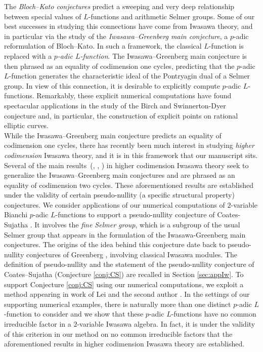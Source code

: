 \documentclass[a4paper,11pt]{article}
\numberwithin{equation}{section}
\begin{document}
The \emph{Bloch--Kato conjectures} predict a sweeping and very deep relationship between special values of $L$-functions and arithmetic Selmer groups. Some of our best successes in studying this connections have come from Iwasawa theory, and in particular via the study of the \textit{Iwasawa--Greenberg main conjecture}, a $p$-adic reformulation of Bloch--Kato. In such a framework, the classical $L$-function is replaced with a \emph{$p$-adic $L$-function}. The Iwasawa--Greenberg main conjecture is then phrased as an equality of codimension one cycles, predicting that the $p$-adic $L$-function generates the characteristic ideal of the Pontryagin dual of a Selmer group. In view of this connection, it is desirable to explicitly compute $p$-adic $L$-functions.  Remarkably, these explicit numerical computations have found spectacular applications in the study of the Birch and Swinnerton-Dyer conjecture and, in particular, the construction of explicit points on rational elliptic curves.\\

While the Iwasawa--Greenberg main conjecture predicts an equality of codimension one cycles, there has recently been much interest in studying \textit{higher codimension} Iwasawa theory, and it is in this framework that our manuscript sits. Several of the main  results~(\cite[Theorem 5.2.5]{bleher2015higher}, \cite[Theorem 1]{lei2018codimension}, \cite[Theorem 1]{lei2019codimension}) in higher codimension Iwasawa theory seek to generalize the Iwasawa--Greenberg main conjectures and are phrased as an equality of codimension two cycles. These aforementioned results are established under the validity of certain pseudo-nullity (a specific structural property) conjectures. We consider applications of our numerical computations of $2$-variable Bianchi $p$-adic $L$-functions to support a pseudo-nullity conjecture of Coates-Sujatha \cite[Conjecture B]{MR2148798}.  It involves the \textit{fine Selmer group}, which is a subgroup of the usual Selmer group that appears in the formulation of the Iwasawa-Greenberg main conjectures. The origins of the idea behind this conjecture date back to pseudo-nullity conjectures of Greenberg \cite{Gre76}, \cite[Conjecture 3.5]{MR1846466} involving classical Iwasawa modules. The definition of pseudo-nullity and the statement of the pseudo-nullity conjecture of Coates--Sujatha (Conjecture \ref{conj:CS}) are recalled in Section \ref{sec:appIw}. To support Conjecture \ref{conj:CS} using our numerical computations, we exploit a method appearing in work of Lei and the second author \cite{lei2018codimension}. In the settings of our supporting numerical examples, there is naturally more than one distinct $p$-adic $L$-function to consider and we show that these $p$-adic $L$-functions have no common irreducible factor in a $2$-variable Iwasawa algebra. In fact, it is under the validity of this criterion in our method  on no common irreducible factors that the aforementioned results in higher codimension Iwasawa theory are established. \\
\end{document}
